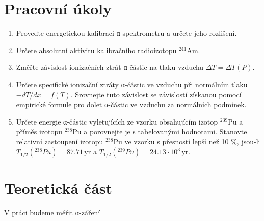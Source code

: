 \documentclass[10pt,a4paper]{article}
\renewcommand{\U}[1]{\ensuremath{\,\mathrm{#1}}}
\newcommand{\°}{\degree}
\begin{document}


\section{Pracovní úkoly}
\begin{enumerate}
    \item Proveďte energetickou kalibraci α-spektrometru a určete jeho rozlišení.
    \item Určete absolutní aktivitu kalibračního radioizotopu $^{241}$Am.
    \item Změřte závislost ionizačních ztrát α-částic na tlaku vzduchu $ΔT = ΔT(P)$.
    \item Určete specifické ionizační ztráty α-částic ve vzduchu při normálním tlaku $-dT/dx = f(T)$. Srovnejte tuto závislost se závislostí získanou pomocí empirické formule pro dolet α-částic ve vzduchu za normálních podmínek.
    \item Určete energie α-částic vyletujících ze vzorku obsahujícím izotop $^{239}$Pu a příměs izotopu $^{238}$Pu a porovnejte je s tabelovanými hodnotami. Stanovte relativní zastoupení izotopu $^{238}$Pu ve vzorku s přesností lepší než 10 \%, jsou-li $T_{1/2}({}^{238}Pu) = 87.71 \U{yr}$ a $T_{1/2}({}^{239}Pu) = 24.13 \cdot 10^3 \U{yr}$.
\end{enumerate}

\pagebreak

\section{Teoretická část}
V práci budeme měřit α-záření

\pagebreak
\end{document}
